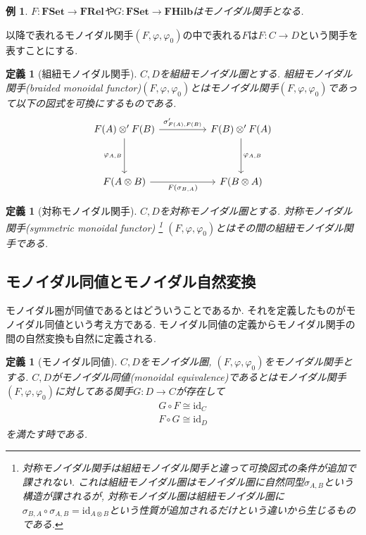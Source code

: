 \documentclass[a4paper,12pt]{ltjsarticle}
\theoremstyle{break}
\newtheorem{defn}[thm]{定義}
\newtheorem{eg}[thm]{例}
\newcommand{\fset}{\mathbf{FSet}}
\newcommand{\frel}{\mathbf{FRel}}
\newcommand{\fhilb}{\mathbf{FHilb}}
\newcommand{\id}{\mathrm{id}}
\newcommand{\ci}{\circ}
\newcommand{\si}{\sigma}
\newcommand{\vp}{\varphi}
\newcommand{\ot}{\otimes}
\numberwithin{equation}{section}
\begin{document}
\begin{eg}
  $F: \fset \to \frel$や$G: \fset \to \fhilb$はモノイダル関手となる. 
\end{eg}

以降で表れるモノイダル関手$(F,\vp,\vp_0)$の中で表れる$F$は$F: C \to D$という関手を表すことにする. 

\begin{defn}[組紐モノイダル関手]
  $C,D$を組紐モノイダル圏とする. 
  組紐モノイダル関手(braided monoidal functor)$(F,\vp,\vp_0)$とはモノイダル関手$(F,\vp,\vp_0)$であって以下の図式を可換にするものである. 
  \[\begin{tikzcd}
    {F(A) \ot' F(B)} && {F(B) \ot' F(A)} \\
    \\
    {F(A \ot B)} && {F(B \ot A)}
    \arrow["{\si_{F(A),F(B)}'}", from=1-1, to=1-3]
    \arrow["{\vp_{A,B}}"', from=1-1, to=3-1]
    \arrow["{F(\si_{B,A})}"', from=3-1, to=3-3]
    \arrow["{\vp_{A,B}}", from=1-3, to=3-3]
  \end{tikzcd}\]
\end{defn}

\begin{defn}[対称モノイダル関手]
  $C,D$を対称モノイダル圏とする. 
  対称モノイダル関手(symmetric monoidal functor)
  \footnote{
    対称モノイダル関手は組紐モノイダル関手と違って可換図式の条件が追加で課されない. 
    これは組紐モノイダル圏はモノイダル圏に自然同型$\si_{A,B}$という構造が課されるが, 対称モノイダル圏は組紐モノイダル圏に$\si_{B,A} \ci \si_{A,B} = \id_{A \ot B}$という性質が追加されるだけという違いから生じるものである. 
  }
  $(F,\vp,\vp_0)$とはその間の組紐モノイダル関手である. 
\end{defn}

\subsection{モノイダル同値とモノイダル自然変換}

モノイダル圏が同値であるとはどういうことであるか. 
それを定義したものがモノイダル同値という考え方である. 
モノイダル同値の定義からモノイダル関手の間の自然変換も自然に定義される. 

\begin{defn}[モノイダル同値]
  $C,D$をモノイダル圏, $(F,\vp,\vp_0)$をモノイダル関手とする. 
  $C,D$がモノイダル同値(monoidal equivalence)であるとはモノイダル関手$(F,\vp,\vp_0)$に対してある関手$G: D \to C$が存在して
  \begin{align*}
    G \ci F \cong \id_C \\
    F \ci G \cong \id_D
  \end{align*}  
  を満たす時である. 
\end{defn} 
\end{document}
